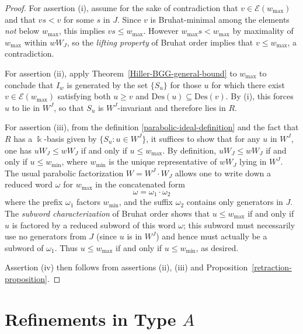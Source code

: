 \documentclass[12pt,dvips]{amsart}
\theoremstyle{plain}
\theoremstyle{definition}
\theoremstyle{remark}
\numberwithin{equation}{section}
\def\Ess{{\mathcal{E}}}
\def\Des{\mathrm{Des}}
\begin{document}
\begin{proof}
For assertion (i), assume for the sake of contradiction that $v\in
\Ess(w_{\max})$ and that $vs < v$ for some $s$ in $J$.  Since $v$ is
Bruhat-minimal among the elements {\it not} below $w_{\max}$, this
implies $vs \leq w_{\max}$.  However $w_{\max} s < w_{\max}$ by
maximality of $w_{\max}$ within $wW_J$, so the {\it lifting property}
\cite[Prop. 2.2.7, Cor. 2.2.8]{BjornerBrenti} of Bruhat order implies
that $v \leq w_{\max}$, a contradiction.

For assertion (ii), apply Theorem~\ref{Hiller-BGG-general-bound} to
$w_{\max}$ to conclude that $I_w$ is generated by the set
$\{S_u\}$ for those $u$ for which there exist $v\in
\Ess(w_{\max})$ satisfying both $u \geq v$ and $\Des(u) \subseteq
\Des(v)$.  By (i), this forces $u$ to lie in $W^J$, so that $S_u$ is
$W^J$-invariant and therefore lies in $R$.

For assertion (iii), from the definition
\eqref{parabolic-ideal-definition} and the fact that $R$ has a
$\Bbbk$-basis given by $\{S_u: u \in W^J\}$, it suffices to show that
for any $u$ in $W^J$, one has $uW_J \leq wW_J$ if and only if $u \leq
w_{\max}$.  By definition, $uW_J \leq wW_J$ if and only if $u \leq
w_{\min}$, where $w_{\min}$ is the unique representative of $wW_J$
lying in $W^J$.  The usual parabolic factorization $W=W^J \cdot W_J$
allows one to write down a reduced word $\omega$ for $w_{\max}$ in the
concatenated form
$$
\omega=\omega_1 \cdot \omega_2
$$
where the prefix $\omega_1$ factors $w_{\min}$, and the suffix
$\omega_2$ contains only generators in $J$.  The {\it subword
characterization} of Bruhat order \cite[Cor. 2.2.3]{BjornerBrenti}
shows that $u \leq w_{\max}$ if and only if $u$ is factored by a
reduced subword of this word $\omega$; this subword must necessarily use no
generators from $J$ (since $u$ is in $W^J$) and hence must actually be a
subword of $\omega_1$.  Thus $u \leq w_{\max}$ if and only if $u \leq
w_{\min}$, as desired.

Assertion (iv) then follows from assertions (ii), (iii) and Proposition~\ref{retraction-proposition}.
\end{proof}







\section{Refinements in Type $A$}
\label{type-A-section}
\end{document}

